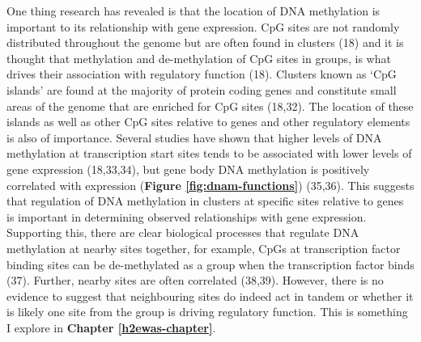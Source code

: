 \documentclass[11pt,oneside]{bristolthesis}
\begin{document}
One thing research has revealed is that the location of DNA methylation is important to its relationship with gene expression. CpG sites are not randomly distributed throughout the genome but are often found in clusters (18) and it is thought that methylation and de-methylation of CpG sites in groups, is what drives their association with regulatory function (18). Clusters known as `CpG islands' are found at the majority of protein coding genes and constitute small areas of the genome that are enriched for CpG sites (18,32). The location of these islands as well as other CpG sites relative to genes and other regulatory elements is also of importance. Several studies have shown that higher levels of DNA methylation at transcription start sites tends to be associated with lower levels of gene expression (18,33,34), but gene body DNA methylation is positively correlated with expression (\textbf{Figure \ref{fig:dnam-functions}}) (35,36). This suggests that regulation of DNA methylation in clusters at specific sites relative to genes is important in determining observed relationships with gene expression. Supporting this, there are clear biological processes that regulate DNA methylation at nearby sites together, for example, CpGs at transcription factor binding sites can be de-methylated as a group when the transcription factor binds (37). Further, nearby sites are often correlated (38,39). However, there is no evidence to suggest that neighbouring sites do indeed act in tandem or whether it is likely one site from the group is driving regulatory function. This is something I explore in \textbf{Chapter \ref{h2ewas-chapter}}.
\end{document}
